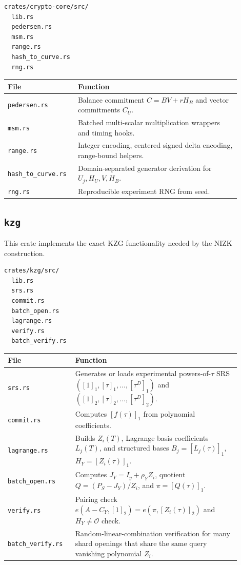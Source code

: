 \documentclass[UTF8,a4paper,11pt]{ctexart}
\begin{document}
\begin{lstlisting}
crates/crypto-core/src/
  lib.rs
  pedersen.rs
  msm.rs
  range.rs
  hash_to_curve.rs
  rng.rs
\end{lstlisting}

\begin{longtable}{p{0.25\linewidth}p{0.65\linewidth}}
\toprule
File & Function \\
\midrule
\texttt{pedersen.rs} & Balance commitment $C=B V+rH_B$ and vector commitments $C_U$. \\
\texttt{msm.rs} & Batched multi-scalar multiplication wrappers and timing hooks. \\
\texttt{range.rs} & Integer encoding, centered signed delta encoding, range-bound helpers. \\
\texttt{hash\_to\_curve.rs} & Domain-separated generator derivation for $U_j,H_U,V,H_B$. \\
\texttt{rng.rs} & Reproducible experiment RNG from seed. \\
\bottomrule
\end{longtable}

\subsection{\texttt{kzg}}

This crate implements the exact KZG functionality needed by the NIZK construction.

\begin{lstlisting}
crates/kzg/src/
  lib.rs
  srs.rs
  commit.rs
  batch_open.rs
  lagrange.rs
  verify.rs
  batch_verify.rs
\end{lstlisting}

\begin{longtable}{p{0.25\linewidth}p{0.65\linewidth}}
\toprule
File & Function \\
\midrule
\texttt{srs.rs} & Generates or loads experimental powers-of-$\tau$ SRS $([1]_1,[\tau]_1,\ldots,[\tau^D]_1)$ and $([1]_2,[\tau]_2,\ldots,[\tau^D]_2)$. \\
\texttt{commit.rs} & Computes $[f(\tau)]_1$ from polynomial coefficients. \\
\texttt{lagrange.rs} & Builds $Z_i(T)$, Lagrange basis coefficients $L_j(T)$, and structured bases $B_j=[L_j(\tau)]_1$, $H_Y=[Z_i(\tau)]_1$. \\
\texttt{batch\_open.rs} & Computes $J_Y=I_y+\rho_Y Z_i$, quotient $Q=(P_S-J_Y)/Z_i$, and $\pi=[Q(\tau)]_1$. \\
\texttt{verify.rs} & Pairing check $e(A-C_Y,[1]_2)=e(\pi,[Z_i(\tau)]_2)$ and $H_Y\ne\mathcal O$ check. \\
\texttt{batch\_verify.rs} & Random-linear-combination verification for many shard openings that share the same query vanishing polynomial $Z_i$. \\
\bottomrule
\end{longtable}
\end{document}
